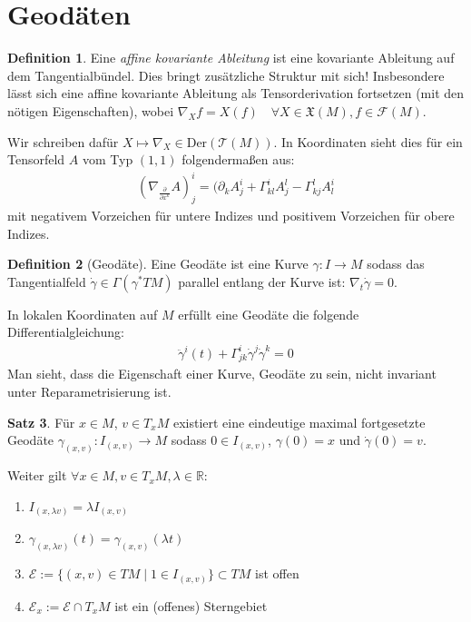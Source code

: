 \documentclass[a4paper]{scrreprt}
\numberwithin{equation}{chapter}
\newcommand{\R}{\mathbb{R}}
\newcommand{\sm}{\mathcal{F}}
\newcommand{\vf}{\mathfrak{X}}
\theoremstyle{definition}
\newtheorem{defn}{Definition}[section]
\newtheorem{satz}[defn]{Satz}
\begin{document}
	\section{Geodäten}
		\begin{defn}
			Eine \emph{affine kovariante Ableitung} ist eine kovariante Ableitung auf dem Tangentialbündel. Dies bringt zusätzliche Struktur mit sich! Insbesondere lässt sich eine affine kovariante Ableitung als Tensorderivation fortsetzen (mit den nötigen Eigenschaften), wobei $\nabla_Xf=X(f) \quad\forall X\in\vf(M),f\in\sm(M)$.
			
			Wir schreiben dafür $X\mapsto\nabla_X\in \mathrm{Der}(\mathcal{T}(M))$. In Koordinaten sieht dies für ein Tensorfeld $A$ vom Typ $(1,1)$ folgendermaßen aus:
			\begin{align*}
				(\nabla_{\frac{\partial}{\partial x^k}} A)^i_j=(\partial_k A^i_j+\Gamma^i_{kl}A^l_j-\Gamma^l_{kj}A^i_l
			\end{align*}
			mit negativem Vorzeichen für untere Indizes und positivem Vorzeichen für obere Indizes.
		\end{defn}
		\begin{defn}[Geodäte]
			Eine Geodäte ist eine Kurve $\gamma\colon I\rightarrow M$ sodass das Tangentialfeld $\dot{\gamma}\in\Gamma(\gamma^*TM)$ parallel entlang der Kurve ist: $\nabla_{t}\dot{\gamma}=0$.
			
			In lokalen Koordinaten auf $M$ erfüllt eine Geodäte die folgende Differentialgleichung:
			\begin{align*}
				\ddot{\gamma}^i(t)+\Gamma^i_{jk}\dot{\gamma}^j\dot{\gamma}^k=0
			\end{align*}
			Man sieht, dass die Eigenschaft einer Kurve, Geodäte zu sein, nicht invariant unter Reparametrisierung ist.
		\end{defn}
		\begin{satz}
			Für $x\in M$, $v\in T_xM$ existiert eine eindeutige maximal fortgesetzte Geodäte $\gamma_{(x,v)}\colon I_{(x,v)}\rightarrow M$ sodass $0\in I_{(x,v)}$, $\gamma(0)=x$ und $\dot{\gamma}(0)=v$.
			
			Weiter gilt $\forall x\in M, v\in T_xM,\lambda\in \R$:
			\begin{enumerate}[label=\arabic* .]
				\item $I_{(x,\lambda v)}=\lambda I_{(x,v)}$
				\item $\gamma_{(x,\lambda v)}(t)=\gamma_{(x, v)}(\lambda t)$
				\item $\mathcal{E}:=\lbrace (x,v)\in TM\mid 1\in I_{(x,v)}\rbrace\subset TM$ ist offen
				\item $\mathcal{E}_x:=\mathcal{E}\cap T_xM$ ist ein (offenes) Sterngebiet
			\end{enumerate}		 
		\end{satz}
\end{document}
